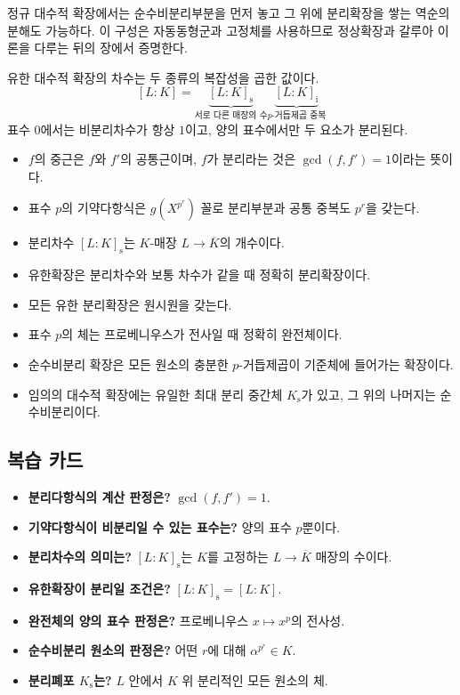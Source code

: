 \begin{remark}
정규 대수적 확장에서는 순수비분리부분을 먼저 놓고 그 위에 분리확장을 쌓는 역순의 분해도 가능하다. 이 구성은 자동동형군과 고정체를 사용하므로 정상확장과 갈루아 이론을 다루는 뒤의 장에서 증명한다.
\end{remark}

\begin{keyidea}
유한 대수적 확장의 차수는 두 종류의 복잡성을 곱한 값이다.
\[
  \boxed{
  [L:K]
  =\underbrace{[L:K]_{\mathrm s}}_{\text{서로 다른 매장의 수}}
   \underbrace{[L:K]_{\mathrm i}}_{\text{$p$-거듭제곱 중복}}
  }
\]
표수 $0$에서는 비분리차수가 항상 $1$이고, 양의 표수에서만 두 요소가 분리된다.
\end{keyidea}

\begin{chapterreview}
\begin{itemize}
  \item $f$의 중근은 $f$와 $f'$의 공통근이며, $f$가 분리라는 것은 $\gcd(f,f')=1$이라는 뜻이다.
  \item 표수 $p$의 기약다항식은 $g(X^{p^r})$ 꼴로 분리부분과 공통 중복도 $p^r$을 갖는다.
  \item 분리차수 $[L:K]_{\mathrm s}$는 $K$-매장 $L\to\overline K$의 개수이다.
  \item 유한확장은 분리차수와 보통 차수가 같을 때 정확히 분리확장이다.
  \item 모든 유한 분리확장은 원시원을 갖는다.
  \item 표수 $p$의 체는 프로베니우스가 전사일 때 정확히 완전체이다.
  \item 순수비분리 확장은 모든 원소의 충분한 $p$-거듭제곱이 기준체에 들어가는 확장이다.
  \item 임의의 대수적 확장에는 유일한 최대 분리 중간체 $K_{\mathrm s}$가 있고, 그 위의 나머지는 순수비분리이다.
\end{itemize}
\end{chapterreview}

\subsection*{복습 카드}

\begin{itemize}
  \item \textbf{분리다항식의 계산 판정은?} $\gcd(f,f')=1$.
  \item \textbf{기약다항식이 비분리일 수 있는 표수는?} 양의 표수 $p$뿐이다.
  \item \textbf{분리차수의 의미는?} $[L:K]_{\mathrm s}$는 $K$를 고정하는 $L\to\overline K$ 매장의 수이다.
  \item \textbf{유한확장이 분리일 조건은?} $[L:K]_{\mathrm s}=[L:K]$.
  \item \textbf{완전체의 양의 표수 판정은?} 프로베니우스 $x\mapsto x^p$의 전사성.
  \item \textbf{순수비분리 원소의 판정은?} 어떤 $r$에 대해 $\alpha^{p^r}\in K$.
  \item \textbf{분리폐포 $K_{\mathrm s}$는?} $L$ 안에서 $K$ 위 분리적인 모든 원소의 체.
\end{itemize}
